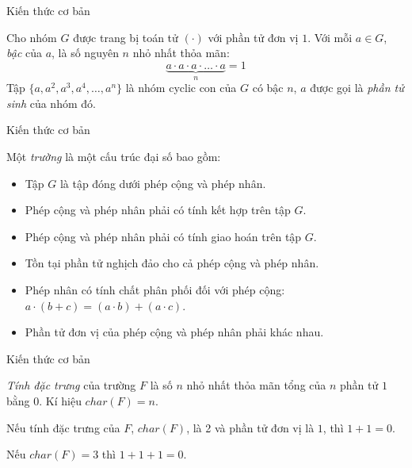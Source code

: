 \documentclass [xcolor=svgnames, t] {beamer}
\theoremstyle{definition}
\begin{document}
\begin{frame}{Kiến thức cơ bản}
    \begin{definition}
        \label{define:2.2}
        Cho nhóm $G$ được trang bị toán tử $(\cdot)$ với phần tử đơn vị $1$. Với mỗi $a \in G$, \textit{bậc} của $a$, là số nguyên $n$ nhỏ nhất thỏa mãn:
        \begin{equation}
            \label{equation:2.1}
            \underbrace{a \cdot a \cdot a \cdot \ldots \cdot a}_{n} = 1
        \end{equation}
        Tập $\{a, a^2, a^3, a^4, \ldots, a^n\}$ là nhóm cyclic con của $G$ có bậc $n$, $a$ được gọi là \textit{phần tử sinh} của nhóm đó.
    \end{definition}
\end{frame}
\begin{frame}{Kiến thức cơ bản}
    \begin{definition}
        \label{define:2.3}
        Một \textit{trường} là một cấu trúc đại số bao gồm:
        \begin{itemize}
            \item Tập $G$ là tập đóng dưới phép cộng và phép nhân.
            \item Phép cộng và phép nhân phải có tính kết hợp trên tập $G$.
            \item Phép cộng và phép nhân phải có tính giao hoán trên tập $G$.
            \item Tồn tại phần tử nghịch đảo cho cả phép cộng và phép nhân.
            \item Phép nhân có tính chất phân phối đối với phép cộng: $a \cdot (b + c) = (a \cdot b) + (a \cdot c)$.
            \item Phần tử đơn vị của phép cộng và phép nhân phải khác nhau.
        \end{itemize}
    \end{definition}
\end{frame}
\begin{frame}{Kiến thức cơ bản}
    \begin{definition}
        \textit{Tính đặc trưng} của trường $F$ là số $n$ nhỏ nhất thỏa mãn tổng của $n$ phần tử $1$ bằng $0$. Kí hiệu $char(F) = n$.
    \end{definition}
    \begin{example}
        Nếu tính đặc trưng của $F$, $char(F)$, là 2 và phần tử đơn vị là $1$, thì $ 1 + 1 = 0 $.

        Nếu $char(F) = 3$ thì $ 1 + 1 + 1 = 0 $.
    \end{example}

\end{frame}
\end{document}
